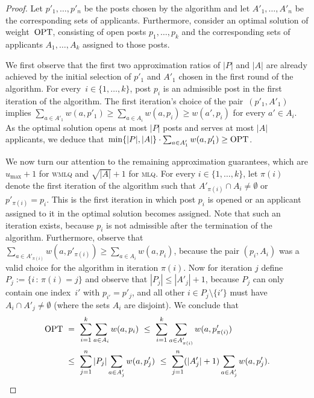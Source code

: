 \documentclass{llncs}
\newcommand{\OPT}{\textup{OPT}}
\begin{document}
\begin{proof}
Let $p'_1, \dots, p'_{n}$ be the posts chosen by the algorithm and let $A'_1, \dots, A'_{n}$ be the corresponding sets of applicants. Furthermore, consider an optimal solution of weight~$\OPT$, consisting of open posts $p_1, \dots, p_k$ and the corresponding sets of applicants $A_1, \dots, A_k$ assigned to those posts.

We first observe that the first two approximation ratios of $|P|$ and $|A|$ are already achieved by the initial selection of $p'_1$ and $A'_1$ chosen in the first round of the algorithm. For every~\mbox{$i \in \{1, \dots, k\}$}, post $p_i$ is an admissible post in the first iteration of the algorithm. The first iteration's choice of the pair~$(p'_1, A'_1)$ implies $\sum_{a \in A'_1} w(a, p'_1) \geq \sum_{a \in A_i} w(a, p_i) \geq w(a', p_i)$ for every $a' \in A_i$. As the optimal solution opens at most $|P|$ posts and serves at most $|A|$ applicants, we deduce that~$\min \{|P|, |A|\} \cdot \sum_{a \in A'_1} w(a, p'_1) \geq  \OPT$.

We now turn our attention to the remaining approximation guarantees, which are $u_{\max} + 1$ for \textsc{wmlq} and $\sqrt{|A|} + 1$ for \textsc{mlq}. For every $i \in \{1, \dots, k\}$, let $\pi(i)$ denote the first iteration of the algorithm such that $A'_{\pi(i)} \cap A_i \neq \emptyset$ or $p'_{\pi(i)} = p_i$. This is the first iteration in which post $p_i$ is opened or an applicant assigned to it in the optimal solution becomes assigned. Note that such an iteration exists, because $p_i$ is not admissible after the termination of the algorithm. Furthermore, observe that $\sum_{a \in A'_{\pi(i)}} w(a, p'_{\pi(i)}) \geq \sum_{a \in A_i} w(a, p_i)$, because the pair $(p_i, A_i)$ was a valid choice for the algorithm in iteration $\pi(i)$. Now for iteration $j$ define $P_j := \{i \, : \, \pi(i) = j\}$ and observe that $|P_j| \leq |A'_j| + 1$, because $P_j$ can only contain one index~$i'$ with $p_{i'} = p'_j$, and all other $i \in P_j \setminus \{i'\}$ must have $A_i \cap A'_j \neq \emptyset$ (where the sets $A_i$ are disjoint). We conclude that
\begin{align*}
\OPT & \ = \ \sum_{i = 1}^k \sum_{a \in A_i} w(a, p_i) \ \leq \ \sum_{i = 1}^k \sum_{a \in A'_{\pi(i)}} w(a, p'_{\pi(i)}) \\
& \ \leq \ \sum_{j = 1}^{n} |P_j| \sum_{a \in A'_j} w(a, p'_j) \ \leq \ \sum_{j = 1}^{n} (|A'_j| + 1) \sum_{a \in A'_j} w(a, p'_j).
\end{align*}


\end{proof}
\end{document}
